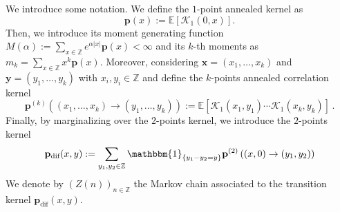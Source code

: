 \documentclass[a4paper,11pt,oneside,reqno]{amsart}
\theoremstyle{definition}
\numberwithin{equation}{section}
\begin{document}
 We introduce some notation. We define the $1$-point annealed kernel as  \begin{equation}\label{one-pts-kernel-general}
 	\mathbf p(x):=\mathbb{E}\left[\mathcal{K}_{1}(0,x)\right].
 \end{equation} 
 Then, we introduce its moment generating function $M(\alpha):=\sum_{x\in \mathbb{Z}}e^{\alpha|x|}\mathbf p(x)<\infty$ and its $k$-th moments as $m_{k}=\sum_{x\in \mathbb{Z}}x^{k}\mathbf p(x)$. 
 Moreover, considering  $\bm{x}=(x_{1},\ldots,x_{k})$ and $\bm{y}=(y_{1},\ldots,y_{k})$ with $x_{i},y_{i}\in \mathbb{Z}$ and define the $k$-points annealed correlation kernel
 \begin{equation*}
 	\mathbf{p}^{(k)}\left((x_{1},\ldots,x_{k})\to (y_{1},\ldots,y_{k})\right):=\mathbb{E}\left[\mathcal{K}_{1}(x_{1},y_{1})\cdots \mathcal{K}_{1}(x_{k},y_{k})\right]\,.
 \end{equation*}
 Finally, by marginalizing over the $2$-points kernel, we introduce the $2$-points kernel
 \begin{equation}\label{p-dif}
 	\mathbf{p}_{\text{dif}}(x,y):=\sum_{y_{1},y_{2}\in\mathbb{Z}}\mathbbm{1}_{\{y_{1}-y_{2}=y\}}\mathbf{p}^{(2)}\left((x,0)\to(y_{1},y_{2})\right)
 \end{equation}
 We denote by  $(Z(n))_{n\in\mathbb{Z}}$ the Markov chain associated to the transition kernel $\mathbf{p}_{\text{dif}}(x,y)$.
\end{document}
